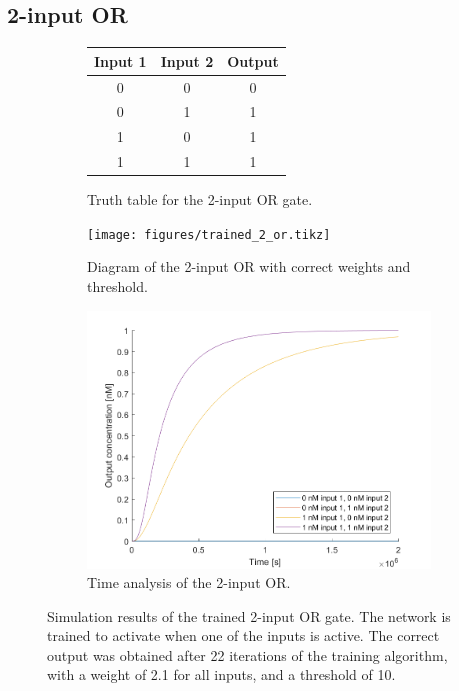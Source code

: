 \subsection{2-input OR}

\begin{figure}[H]
  \begin{subfigure}[t]{.49\columnwidth}

      \centering
    \begin{tabular}[b]{ccc}
      \hline
    \multicolumn{1}{l}{\textbf{Input 1}} & \multicolumn{1}{l}{\textbf{Input 2}} & \multicolumn{1}{l}{\textbf{Output}} \\
    \hline
    0                                    & 0                                    & 0                                   \\
    0                                    & 1                                    & 1                                   \\
    1                                    & 0                                    & 1                                   \\
    1                                    & 1                                    & 1 \\
    \hline
    \end{tabular}
    \caption{Truth table for the 2-input OR gate.}
    \label{and_table}
\end{subfigure}
\begin{subfigure}[t]{.49\textwidth}
  \texttt{[image: figures/trained\_2\_or.tikz]}
  \caption{Diagram of the 2-input OR with correct weights and threshold.}
\end{subfigure}
\hfill
\begin{subfigure}[t]{\textwidth}
  \centering
\includegraphics[width=\textwidth]{images/or_simulation.png}
\caption{Time analysis of the 2-input OR.}
\label{}
\end{subfigure}
\caption{Simulation results of the trained 2-input OR gate. The network is trained to activate when one of the inputs is active. The correct output was obtained after 22 iterations of the training algorithm, with a weight of 2.1 for all inputs, and a threshold of 10.}
\end{figure}

